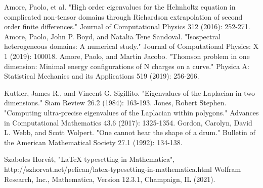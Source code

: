 \documentclass[final]{article}
\begin{document}
\begin{thebibliography}{}
		
 Amore, Paolo, et al. "High order eigenvalues for the Helmholtz equation in complicated non-tensor domains through Richardson extrapolation of second order finite differences." Journal of Computational Physics 312 (2016): 252-271.
 Amore, Paolo, John P. Boyd, and Natalia Tene Sandoval. "Isospectral heterogeneous domains: A numerical study." Journal of Computational Physics: X 1 (2019): 100018.
 Amore, Paolo, and Martin Jacobo. "Thomson problem in one dimension: Minimal energy configurations of N charges on a curve." Physica A: Statistical Mechanics and its Applications 519 (2019): 256-266.
	
 Kuttler, James R., and Vincent G. Sigillito. "Eigenvalues of the Laplacian in two dimensions." Siam Review 26.2 (1984): 163-193.
 Jones, Robert Stephen. "Computing ultra-precise eigenvalues of the Laplacian within polygons." Advances in Computational Mathematics 43.6 (2017): 1325-1354.	
 Gordon, Carolyn, David L. Webb, and Scott Wolpert. "One cannot hear the shape of a drum." Bulletin of the American Mathematical Society 27.1 (1992): 134-138.

 Szabolcs Horvát, "LaTeX typesetting in Mathematica",  http://szhorvat.net/pelican/latex-typesetting-in-mathematica.html
 Wolfram Research, Inc., Mathematica, Version 12.3.1, Champaign, IL (2021).
	
\end{thebibliography}


\appendix
\end{document}
